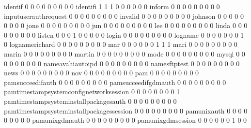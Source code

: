 \documentclass[compress,8pt]{beamer}
\begin{document}
\begin{frame}
\begin{Schunk}
  identif                                    0   0   0   0   0   0   0   0   0
  identifi                                   1   1   1   0   0   0   0   0   0
  inform                                     0   0   0   0   0   0   0   0   0
  inputuserauthrequest                       0   0   0   0   0   0   0   0   0
  invalid                                    0   0   0   0   0   0   0   0   0
  johnson                                    0   0   0   0   0   0   0   0   0
  jone                                       0   0   0   0   0   0   0   0   0
  jun                                        0   0   0   0   0   0   0   0   0
  lee                                        0   0   0   0   0   0   0   0   0
  linda                                      0   0   0   0   0   0   0   0   0
  listen                                     0   0   0   1   0   0   0   0   0
  login                                      0   0   0   0   0   0   0   0   0
  logname                                    0   0   0   0   0   0   0   1   0
  lognamerichard                             0   0   0   0   0   0   0   0   0
  mar                                        0   0   0   0   0   0   1   1   1
  mari                                       0   0   0   0   0   0   0   0   0
  marin                                      0   0   0   0   0   0   0   0   0
  martin                                     0   0   0   0   0   0   0   0   0
  mode                                       0   0   0   0   0   0   0   0   0
  mysql                                      0   0   0   0   0   0   0   0   0
  nameavahiautoipd                           0   0   0   0   0   0   0   0   0
  namesftptest                               0   0   0   0   0   0   0   0   0
  news                                       0   0   0   0   0   0   0   0   0
  nov                                        0   0   0   0   0   0   0   0   0
  pam                                        0   0   0   0   0   0   0   0   0
  pamsucceedifauth                           0   0   0   0   0   0   0   0   0
  pamsucceedifgdmauth                        0   0   0   0   0   0   0   0   0
  pamtimestampsystemconfignetworksession     0   0   0   0   0   0   0   0   1
  pamtimestampsysteminstallpackagesauth      0   0   0   0   0   0   0   0   0
  pamtimestampsysteminstallpackagessession   0   0   0   0   0   0   0   0   0
  pamunixauth                                0   0   0   0   0   0   0   0   0
  pamunixgdmauth                             0   0   0   0   0   0   0   0   0
  pamunixgdmsession                          0   0   0   0   0   0   1   0   0

\end{Schunk}
\end{frame}
\end{document}
